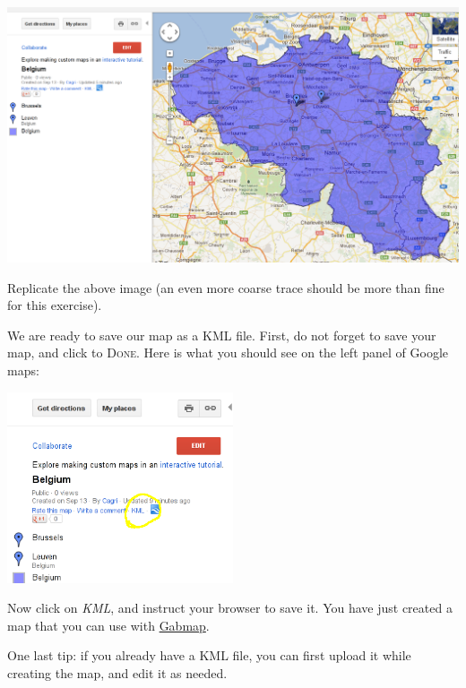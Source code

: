 \documentclass{article}
\newcommand{\gabmap}{\href{http://www.gabmap.nl/}{Gabmap}}
\begin{document}
\begin{center}
\includegraphics[width=\textwidth]{images/google-maps-borders.png}
\end{center}

\begin{Exercise}
Replicate the above image (an even more coarse trace should be more than
fine for this exercise).
\end{Exercise}

We are ready to save our map as a KML file. First, do not forget
to save your map, and click to \textsc{Done}. Here is what you
should see on the left panel of Google maps:

\begin{center}
\includegraphics[width=0.5\textwidth]{images/google-maps-kml.png}
\end{center}

Now click on \emph{KML}, and instruct your browser to save it. You
have just created a map that you can use with \gabmap{}.

One last tip: if you already have a KML file, you can first upload it
while creating the map, and edit it as needed.
\end{document}
